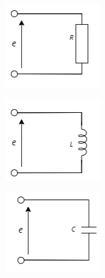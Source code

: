 \documentclass[twocolumn]{article}
\begin{document}
\begin{enumerate}
        \begin{center}
          \includegraphics[width=0.6\linewidth]{./Circuits/Circuits_a.png}
        \end{center}
        \begin{center}
          \includegraphics[width=0.6\linewidth]{./Circuits/Circuits_b.png}
        \end{center}
        \begin{center}
          \includegraphics[width=0.6\linewidth]{./Circuits/Circuits_c.png}
        \end{center}


\end{enumerate}
\end{document}
